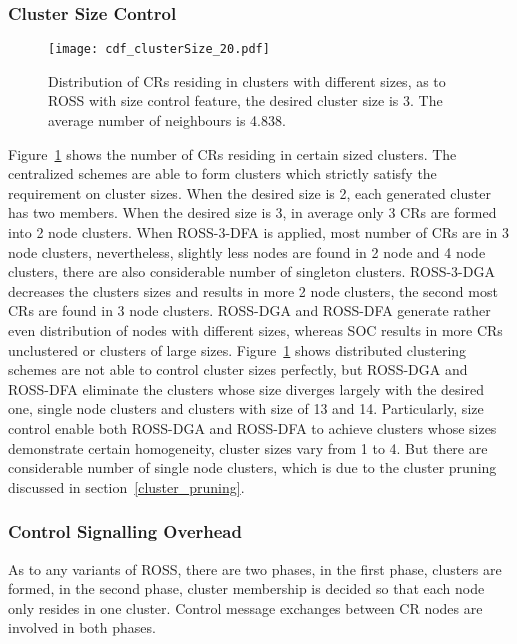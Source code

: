 

\subsubsection{Cluster Size Control}
\label{cluster_size}
\begin{figure}[ht!]
  \centering
  \texttt{[image: cdf\_clusterSize\_20.pdf]}
  \caption{Distribution of CRs residing in clusters with different sizes, as to ROSS with size control feature, the desired cluster size is 3. The average number of neighbours is 4.838.}
  \label{size_control}
\end{figure}
Figure~\ref{size_control} shows the number of CRs residing in certain sized clusters.
The centralized schemes are able to form clusters which strictly satisfy the requirement on cluster sizes.
When the desired size is 2, each generated cluster has two members.
When the desired size is 3, in average only 3 CRs are formed into 2 node clusters.
When ROSS-3-DFA is applied, most number of CRs are in 3 node clusters, nevertheless, slightly less nodes are found in 2 node and 4 node clusters, there are also considerable number of singleton clusters.
ROSS-3-DGA decreases the clusters sizes and results in more 2 node clusters, the second most CRs are found in 3 node clusters.
ROSS-DGA and ROSS-DFA generate rather even distribution of nodes with different sizes, whereas SOC results in more CRs unclustered or clusters of large sizes. 
Figure~\ref{size_control} shows distributed clustering schemes are not able to control cluster sizes perfectly, but ROSS-DGA and ROSS-DFA eliminate the clusters whose size diverges largely with the desired one, \ie single node clusters and clusters with size of 13 and 14.
Particularly, size control enable both ROSS-DGA and ROSS-DFA to achieve clusters whose sizes demonstrate certain homogeneity, \ie cluster sizes vary from 1 to 4.
But there are considerable number of single node clusters, which is due to the cluster pruning discussed in section~\ref{cluster_pruning}.

\subsubsection{Control Signalling Overhead}
As to any variants of ROSS, there are two phases, in the first phase, clusters are formed, in the second phase, cluster membership is decided so that each node only resides in one cluster.
Control message exchanges between CR nodes are involved in both phases.

